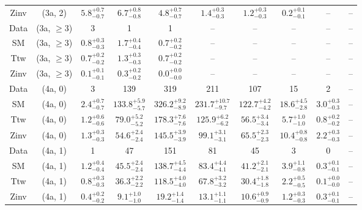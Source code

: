 \begin{table}[h!]
{\begin{tabular}{cccccccccc}
	Zinv & (3a, 2) & $5.8^{+ 0.7 }_{- 0.7 }$ & $6.7^{+ 0.8 }_{- 0.8 }$ & $4.8^{+ 0.7 }_{- 0.7 }$ & $1.4^{+ 0.3 }_{- 0.3 }$ & $1.2^{+ 0.3 }_{- 0.3 }$ & $0.2^{+ 0.1 }_{- 0.1 }$ & -- & -- \\[0.5ex] 
	Data & (3a, $\ge3$) & 3 & 1 & 1 & -- & -- & -- & -- & -- \\[0.5ex] 
	SM & (3a, $\ge3$) & $0.8^{+ 0.3 }_{- 0.3 }$ & $1.7^{+ 0.4 }_{- 0.4 }$ & $0.7^{+ 0.2 }_{- 0.2 }$ & -- & -- & -- & -- & -- \\[0.5ex] 
	Ttw & (3a, $\ge3$) & $0.7^{+ 0.2 }_{- 0.2 }$ & $1.3^{+ 0.3 }_{- 0.3 }$ & $0.7^{+ 0.2 }_{- 0.2 }$ & -- & -- & -- & -- & -- \\[0.5ex] 
	Zinv & (3a, $\ge3$) & $0.1^{+ 0.1 }_{- 0.1 }$ & $0.3^{+ 0.2 }_{- 0.2 }$ & $0.0^{+ 0.0 }_{- 0.0 }$ & -- & -- & -- & -- & -- \\[0.5ex] 
	Data & (4a, 0) & 3 & 139 & 319 & 211 & 107 & 15 & 2 & -- \\[0.5ex] 
	SM & (4a, 0) & $2.4^{+ 0.7 }_{- 0.7 }$ & $133.8^{+ 5.9 }_{- 5.7 }$ & $326.2^{+ 9.2 }_{- 8.9 }$ & $231.7^{+ 10.7 }_{- 9.7 }$ & $122.7^{+ 4.2 }_{- 4.2 }$ & $18.6^{+ 4.5 }_{- 2.8 }$ & $3.0^{+ 0.3 }_{- 0.3 }$ & -- \\[0.5ex] 
	Ttw & (4a, 0) & $1.2^{+ 0.6 }_{- 0.6 }$ & $79.0^{+ 5.2 }_{- 5.2 }$ & $178.3^{+ 7.6 }_{- 7.6 }$ & $125.9^{+ 6.2 }_{- 6.2 }$ & $56.5^{+ 3.4 }_{- 3.4 }$ & $5.7^{+ 1.0 }_{- 1.0 }$ & $0.8^{+ 0.2 }_{- 0.2 }$ & -- \\[0.5ex] 
	Zinv & (4a, 0) & $1.3^{+ 0.3 }_{- 0.3 }$ & $54.6^{+ 2.4 }_{- 2.4 }$ & $145.5^{+ 3.9 }_{- 3.9 }$ & $99.1^{+ 3.1 }_{- 3.1 }$ & $65.5^{+ 2.3 }_{- 2.3 }$ & $10.4^{+ 0.8 }_{- 0.8 }$ & $2.2^{+ 0.3 }_{- 0.3 }$ & -- \\[0.5ex] 
	Data & (4a, 1) & 1 & 47 & 151 & 81 & 45 & 3 & 0 & -- \\[0.5ex] 
	SM & (4a, 1) & $1.2^{+ 0.4 }_{- 0.4 }$ & $45.5^{+ 2.4 }_{- 2.4 }$ & $138.7^{+ 4.5 }_{- 4.4 }$ & $83.4^{+ 4.4 }_{- 4.1 }$ & $41.2^{+ 2.1 }_{- 2.1 }$ & $3.9^{+ 1.1 }_{- 0.8 }$ & $0.3^{+ 0.1 }_{- 0.1 }$ & -- \\[0.5ex] 
	Ttw & (4a, 1) & $0.8^{+ 0.3 }_{- 0.3 }$ & $36.3^{+ 2.2 }_{- 2.2 }$ & $118.5^{+ 4.0 }_{- 4.0 }$ & $67.8^{+ 3.2 }_{- 3.2 }$ & $30.4^{+ 1.8 }_{- 1.8 }$ & $2.2^{+ 0.5 }_{- 0.5 }$ & $0.1^{+ 0.0 }_{- 0.0 }$ & -- \\[0.5ex] 
	Zinv & (4a, 1) & $0.4^{+ 0.2 }_{- 0.2 }$ & $9.1^{+ 1.0 }_{- 1.0 }$ & $19.2^{+ 1.4 }_{- 1.4 }$ & $13.1^{+ 1.1 }_{- 1.1 }$ & $10.6^{+ 0.9 }_{- 0.9 }$ & $1.2^{+ 0.3 }_{- 0.3 }$ & $0.3^{+ 0.1 }_{- 0.1 }$ & -- \\[0.5ex] 

\end{tabular}}
\end{table}
